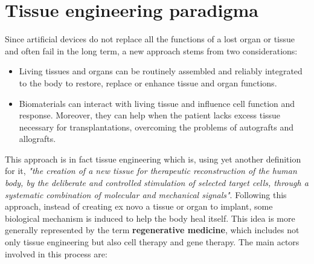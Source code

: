 \section{Tissue engineering paradigma}
Since artificial devices do not replace all the functions of a lost organ or tissue and often fail in the long term, a new approach stems from two considerations:

\begin{multicols}{2}
  \begin{itemize}
    \item Living tissues and organs can be routinely assembled and reliably integrated to the body to restore, replace or enhance tissue and organ functions.
    \item Biomaterials can interact with living tissue and influence cell function and response. Moreover, they can help when the patient lacks excess tissue necessary for transplantations, overcoming the problems of autografts and allografts.
  \end{itemize}
\end{multicols}

This approach is in fact tissue engineering which is, using yet another definition for it, \textit{"the creation of a new tissue for therapeutic reconstruction of the human body, by the deliberate and controlled stimulation of selected target cells, through a systematic combination of molecular and mechanical signals"}.
Following this approach, instead of creating ex novo a tissue or organ to implant, some biological mechanism is induced to help the body heal itself.
This idea is more generally represented by the term \textbf{regenerative medicine}, which includes not only tissue engineering but also cell therapy and gene therapy.
The main actors involved in this process are:

